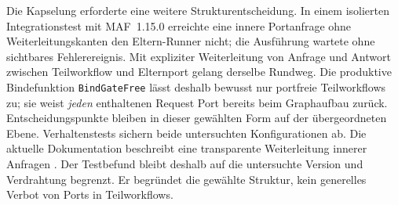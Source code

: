 Die Kapselung erforderte eine weitere Strukturentscheidung. In einem
isolierten Integrationstest mit MAF~1.15.0 erreichte eine innere
Portanfrage ohne Weiterleitungskanten den Eltern-Runner nicht; die
Ausführung wartete ohne sichtbares Fehlerereignis. Mit expliziter
Weiterleitung von Anfrage und Antwort zwischen Teilworkflow und
Elternport gelang derselbe Rundweg. Die produktive Bindefunktion
\texttt{BindGateFree} lässt deshalb bewusst nur portfreie
Teilworkflows zu; sie weist \emph{jeden} enthaltenen Request Port
bereits beim Graphaufbau zurück. Entscheidungspunkte bleiben in
dieser gewählten Form auf der übergeordneten Ebene.
Verhaltenstests sichern beide untersuchten Konfigurationen ab.
Die aktuelle Dokumentation beschreibt eine transparente Weiterleitung
innerer Anfragen
\cite[Abschnitt~„Requests and Responses“]{msmaf2026subworkflows}.
Der Testbefund bleibt deshalb auf die
untersuchte Version und Verdrahtung begrenzt. Er begründet die gewählte
Struktur, kein generelles Verbot von Ports in Teilworkflows.
